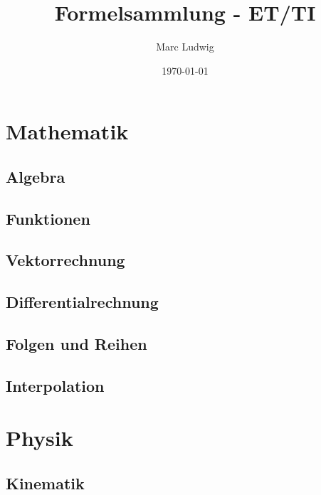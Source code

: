 \documentclass[a5paper]{report}
\title{Formelsammlung - ET/TI}
\author{Marc Ludwig}
\date{\today}
\begin{document}
\maketitle

	\tableofcontents

	\part{Mathematik}
	
		\chapter{Algebra}
		
		
		\chapter{Funktionen}
		
		
		\chapter{Vektorrechnung}
		
		
		\chapter{Differentialrechnung}
		
		
		
		
		\chapter{Folgen und Reihen}
		
		
		\chapter{Interpolation}
				

	\part{Physik}
	
		\chapter{Kinematik}
		
\end{document}
